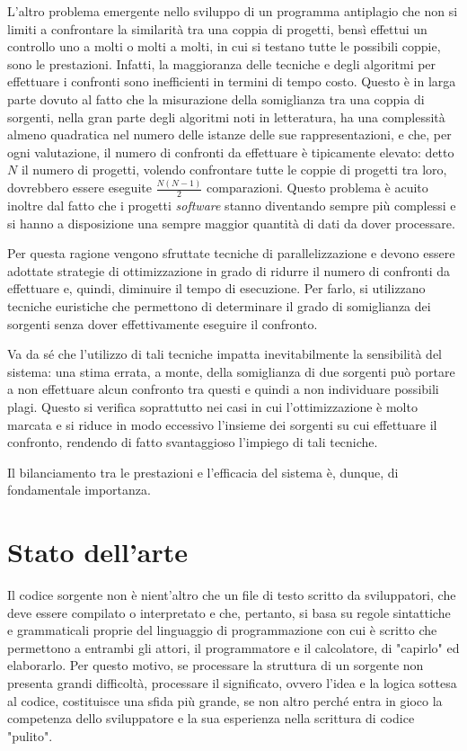 L'altro problema emergente nello sviluppo di un programma antiplagio che non si limiti a confrontare la similarità tra una coppia di progetti, bensì effettui un controllo uno a molti o molti a molti, in cui si testano tutte le possibili coppie, sono le prestazioni. 
%
Infatti, la maggioranza delle tecniche e degli algoritmi per effettuare i confronti sono inefficienti in termini di tempo costo. 
%
Questo è in larga parte dovuto al fatto che la misurazione della somiglianza tra una coppia di sorgenti, nella gran parte degli algoritmi noti in letteratura, ha una complessità almeno quadratica nel numero delle istanze delle sue rappresentazioni, e che, per ogni valutazione, il numero di confronti da effettuare è tipicamente elevato: detto $N$ il numero di progetti, volendo confrontare tutte le coppie di progetti tra loro, dovrebbero essere eseguite $\frac{N(N-1)}{2}$ comparazioni.
%
Questo problema è acuito inoltre dal fatto che i progetti \textit{software} stanno diventando sempre più complessi e si hanno a disposizione una sempre maggior quantità di dati da dover processare.

Per questa ragione vengono sfruttate tecniche di parallelizzazione e devono essere adottate strategie di ottimizzazione in grado di ridurre il numero di confronti da effettuare e, quindi, diminuire il tempo di esecuzione.
%
Per farlo, si utilizzano tecniche euristiche che permettono di determinare il grado di somiglianza dei sorgenti senza dover effettivamente eseguire il confronto.

Va da sé che l'utilizzo di tali tecniche impatta inevitabilmente la sensibilità del sistema: una stima errata, a monte, della somiglianza di due sorgenti può portare a non effettuare alcun confronto tra questi e quindi a non individuare possibili plagi. 
%
Questo si verifica soprattutto nei casi in cui l'ottimizzazione è molto marcata e si riduce in modo eccessivo l'insieme dei sorgenti su cui effettuare il confronto, rendendo di fatto svantaggioso l'impiego di tali tecniche.

Il bilanciamento tra le prestazioni e l'efficacia del sistema è, dunque, di fondamentale importanza.

\section{Stato dell'arte}
Il codice sorgente non è nient'altro che un file di testo scritto da sviluppatori, che deve essere compilato o interpretato e che, pertanto, si basa su regole sintattiche e grammaticali proprie del linguaggio di programmazione con cui è scritto che permettono a entrambi gli attori, il programmatore e il calcolatore, di "capirlo" ed elaborarlo.
%
Per questo motivo, se processare la struttura di un sorgente non presenta grandi difficoltà, processare il significato, ovvero l'idea e la logica sottesa al codice, costituisce una sfida più grande, se non altro perché entra in gioco la competenza dello sviluppatore e la sua esperienza nella scrittura di codice "pulito".

